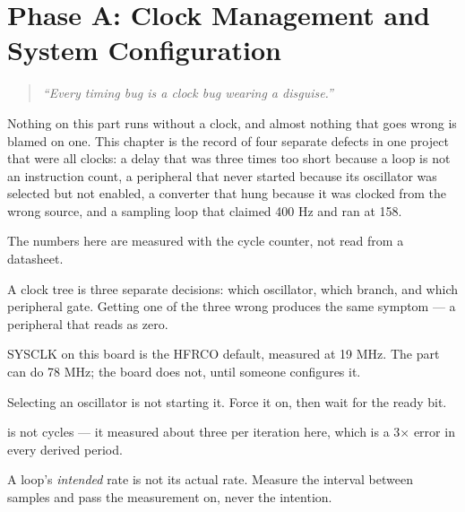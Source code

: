 
\chapter{Phase A: Clock Management and System Configuration}
\label{ch:chapter-05}

\begin{quote}
    \textit{``Every timing bug is a clock bug wearing a disguise.''}
\end{quote}

Nothing on this part runs without a clock, and almost nothing that goes wrong is blamed on one. This
chapter is the record of four separate defects in one project that were all clocks: a delay that was
three times too short because a loop is not an instruction count, a peripheral that never started
because its oscillator was selected but not enabled, a converter that hung because it was clocked
from the wrong source, and a sampling loop that claimed 400 Hz and ran at 158.

The numbers here are measured with the cycle counter, not read from a datasheet.

\minitoc

\clearpage







\clearpage

\begin{keytakeaways}
    \item A clock tree is three separate decisions: which oscillator, which branch, and which
          peripheral gate. Getting one of the three wrong produces the same symptom — a peripheral
          that reads as zero.
    \item SYSCLK on this board is the HFRCO default, measured at 19 MHz. The part can do 78 MHz; the
          board does not, until someone configures it.
    \item Selecting an oscillator is not starting it. Force it on, then wait for the ready bit.
    \item {} is not  cycles — it measured about three per
          iteration here, which is a 3× error in every derived period.
    \item A loop's \emph{intended} rate is not its actual rate. Measure the interval between samples
          and pass the measurement on, never the intention.
\end{keytakeaways}
